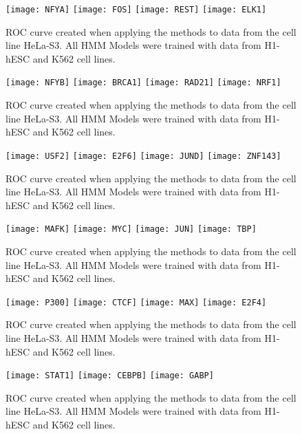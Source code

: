 \documentclass[11pt,a4]{article}
\begin{document}
\begin{figure}[h]
\centering
    \texttt{[image: NFYA]}
    \texttt{[image: FOS]}
    \texttt{[image: REST]}
    \texttt{[image: ELK1]}
\caption{ROC curve created when applying the methods to data from the cell line HeLa-S3. All HMM Models were trained with data from H1-hESC and K562 cell lines.}
\label{fig:roc.HeLaS3.1}
\end{figure}

\begin{figure}[h]
\centering
    \texttt{[image: NFYB]}
    \texttt{[image: BRCA1]}
    \texttt{[image: RAD21]}
    \texttt{[image: NRF1]}
\caption{ROC curve created when applying the methods to data from the cell line HeLa-S3. All HMM Models were trained with data from H1-hESC and K562 cell lines.}
\label{fig:roc.HeLaS3.2}
\end{figure}

\begin{figure}[h]
\centering
    \texttt{[image: USF2]}
    \texttt{[image: E2F6]}
    \texttt{[image: JUND]}
    \texttt{[image: ZNF143]}
\caption{ROC curve created when applying the methods to data from the cell line HeLa-S3. All HMM Models were trained with data from H1-hESC and K562 cell lines.}
\label{fig:roc.HeLaS3.3}
\end{figure}

\begin{figure}[h]
\centering
    \texttt{[image: MAFK]}
    \texttt{[image: MYC]}
    \texttt{[image: JUN]}
    \texttt{[image: TBP]}
\caption{ROC curve created when applying the methods to data from the cell line HeLa-S3. All HMM Models were trained with data from H1-hESC and K562 cell lines.}
\label{fig:roc.HeLaS3.4}
\end{figure}

\begin{figure}[h]
\centering
    \texttt{[image: P300]}
    \texttt{[image: CTCF]}
    \texttt{[image: MAX]}
    \texttt{[image: E2F4]}
\caption{ROC curve created when applying the methods to data from the cell line HeLa-S3. All HMM Models were trained with data from H1-hESC and K562 cell lines.}
\label{fig:roc.HeLaS3.5}
\end{figure}

\begin{figure}[h]
\centering
    \texttt{[image: STAT1]}
    \texttt{[image: CEBPB]}
    \texttt{[image: GABP]}
\caption{ROC curve created when applying the methods to data from the cell line HeLa-S3. All HMM Models were trained with data from H1-hESC and K562 cell lines.}
\label{fig:roc.HeLaS3.6}
\end{figure}
\end{document}
